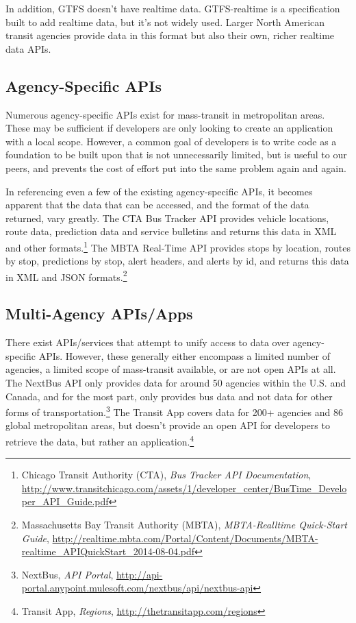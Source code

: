 \documentclass[12pt]{article}
\begin{document}
In addition, GTFS doesn't have realtime data. GTFS-realtime is a specification built to add
realtime data, but it's not widely used. Larger North American transit agencies provide
data in this format but also their own, richer realtime data APIs.

\subsection{Agency-Specific APIs}

Numerous agency-specific APIs exist for mass-transit in metropolitan areas.
These may be sufficient if developers are only looking to create an application with a local scope. However,
a common goal of developers is to write code as a foundation to be built upon that is not unnecessarily limited,
but is useful to our peers, and prevents the cost of effort put into the same
problem again and again.

In referencing even a few of the existing agency-specific APIs, it
becomes apparent that the data that can be accessed, and the format of the data returned, 
vary greatly. The CTA Bus Tracker API provides vehicle locations, route data, prediction data and 
service bulletins and returns this data in XML and other formats.\footnote{Chicago Transit Authority (CTA), \textit{Bus Tracker API Documentation},
\url{http://www.transitchicago.com/assets/1/developer\_center/BusTime\_Developer\_API\_Guide.pdf}} The MBTA Real-Time API provides
stops by location, routes by stop, predictions by stop, alert headers, and alerts by id, and returns 
this data in XML and JSON formats.\footnote{Massachusetts Bay Transit Authority (MBTA), \textit{MBTA-Realltime Quick-Start Guide},
\url{http://realtime.mbta.com/Portal/Content/Documents/MBTA-realtime\_APIQuickStart\_2014-08-04.pdf}}

\subsection{Multi-Agency APIs/Apps}
There exist APIs/services that attempt to unify access to data over agency-specific APIs.
However, these generally either encompass a limited number of agencies, a limited scope
of mass-transit available, or are not open APIs at all. The NextBus API only provides data for
around 50 agencies within the U.S. and Canada, and for the most part, only provides bus data 
and not data for other forms of transportation.\footnote{NextBus, \textit{API Portal}, \url{http://api-portal.anypoint.mulesoft.com/nextbus/api/nextbus-api}} The Transit App covers data for 200+ agencies
and 86 global metropolitan areas, but doesn't provide an open API for developers to retrieve the
data, but rather an application.\footnote{Transit App, \textit{Regions}, \url{http://thetransitapp.com/regions}}
\end{document}
